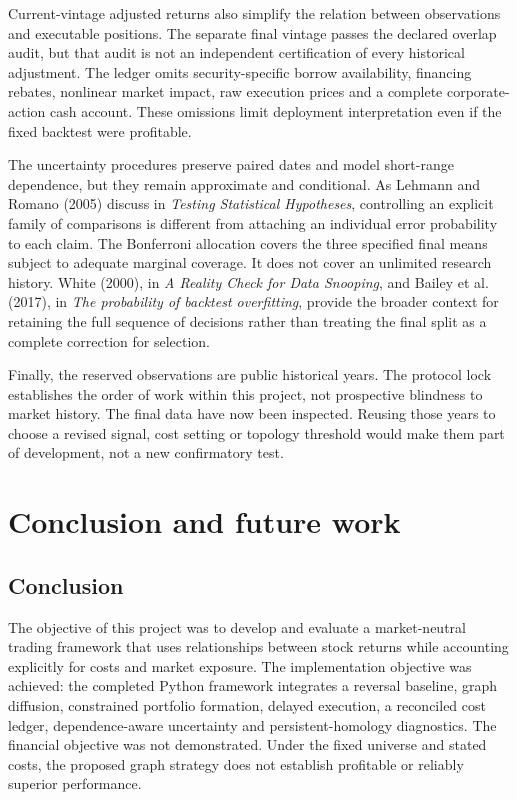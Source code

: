 \documentclass[12pt,a4paper,oneside]{article}
\newcommand{\bodyheading}[1]{\clearpage\section{#1}}
\begin{document}
Current-vintage adjusted returns also simplify the relation between observations and executable positions. The separate final vintage passes the declared overlap audit, but that audit is not an independent certification of every historical adjustment. The ledger omits security-specific borrow availability, financing rebates, nonlinear market impact, raw execution prices and a complete corporate-action cash account. These omissions limit deployment interpretation even if the fixed backtest were profitable.


The uncertainty procedures preserve paired dates and model short-range dependence, but they remain approximate and conditional. As Lehmann and Romano (2005) discuss in \textit{Testing Statistical Hypotheses}, controlling an explicit family of comparisons is different from attaching an individual error probability to each claim. The Bonferroni allocation covers the three specified final means subject to adequate marginal coverage. It does not cover an unlimited research history. White (2000), in \textit{A Reality Check for Data Snooping}, and Bailey et al. (2017), in \textit{The probability of backtest overfitting}, provide the broader context for retaining the full sequence of decisions rather than treating the final split as a complete correction for selection.


Finally, the reserved observations are public historical years. The protocol lock establishes the order of work within this project, not prospective blindness to market history. The final data have now been inspected. Reusing those years to choose a revised signal, cost setting or topology threshold would make them part of development, not a new confirmatory test.


\bodyheading{Conclusion and future work}

\subsection{Conclusion}

The objective of this project was to develop and evaluate a market-neutral trading framework that uses relationships between stock returns while accounting explicitly for costs and market exposure. The implementation objective was achieved: the completed Python framework integrates a reversal baseline, graph diffusion, constrained portfolio formation, delayed execution, a reconciled cost ledger, dependence-aware uncertainty and persistent-homology diagnostics. The financial objective was not demonstrated. Under the fixed universe and stated costs, the proposed graph strategy does not establish profitable or reliably superior performance.
\end{document}
